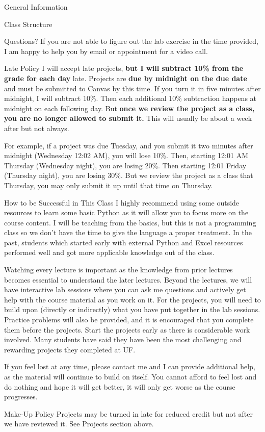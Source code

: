 \documentclass[11pt]{resume}
\begin{document}
\begin{section}{General Information}
\begin{subsection}{Class Structure}
\begin{subsubsection}{Questions?}
If you are not able to figure out the lab exercise in the time provided, I am happy to help you by email or 
appointment for a video call.
\end{subsubsection}
\begin{subsubsection}{Late Policy}
I will accept late projects, \textbf{but I will subtract 10\% from the grade for each day} late. Projects are 
\textbf{due by midnight on the due date} and must be submitted to Canvas by this time. If you turn it in 
five minutes after midnight, I will subtract 10\%. Then each additional 10\% subtraction happens at midnight on each 
following day. But \textbf{once we review the project as a class, you are no longer allowed to submit it.} 
This will usually be about a week after but not always.

For example, if a project was due Tuesday, and you submit it two minutes after midnight (Wednesday 12:02 AM), 
you will lose
10\%. Then, starting 12:01 AM Thursday (Wednesday night), you are losing 20\%. Then starting 12:01 Friday
(Thursday night), you are losing 30\%. But we review the project as a class that Thursday, you may only
submit it up until that time on Thursday.
\end{subsubsection}
\begin{subsubsection}{How to be Successful in This Class}
I highly recommend using some outside resources to learn some basic Python as it will allow you
to focus more on the course content. I will be teaching from the basics, but this is not a programming
class so we don't have the time to give the language a proper treatment. In the past, students which started early
with external Python and Excel resources performed well and got more applicable knowledge out of the class.
                
Watching every lecture is important as the knowledge from prior lectures becomes essential 
to understand the later lectures. Beyond the lectures, we will have interactive lab
sessions where you can ask me questions and actively get help with the course material as you work on it. For
the projects, you will need to build upon (directly or indirectly) what you have put together in the lab sessions.
Practice problems will also be provided, and it is encouraged that you complete them
before the projects. Start the projects early as there is considerable work involved. Many students have
said they have been the most challenging and rewarding projects they completed at UF.

If you feel lost at any time, please contact me and I can provide additional help, as the
material will continue to build on itself. You cannot afford to feel lost and do nothing and 
hope it will get better, it will only get worse as the course progresses.
\end{subsubsection}
\begin{subsubsection}{Make-Up Policy}
Projects may be turned in late for reduced credit but not after we have reviewed it. See Projects section
above.
\end{subsubsection}
\end{subsection}
\end{section}
\end{document}
